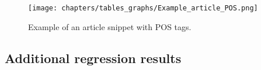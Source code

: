%
%
\begin{figure}[!h]
	\centering
	\texttt{[image: chapters/tables\_graphs/Example\_article\_POS.png]} 
	\caption{Example of an article snippet with POS tags.}
	\label{fig:POStaggedArticle}
\end{figure}
%

\newpage
\subsection{Additional regression results}
%


%


%
